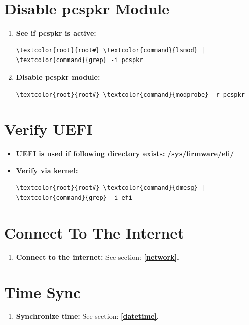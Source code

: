 \documentclass[10pt, a4paper, onecolumn, oneside, titlepage, openany]{book}
\begin{document}
\section{Disable pcspkr Module}
\begin{enumerate}
    \item \textbf{See if pcspkr is active:}  
\begin{Verbatim}[commandchars=\\\{\}]
\textcolor{root}{root#} \textcolor{command}{lsmod} | \textcolor{command}{grep} -i pcspkr
\end{Verbatim}
    \item \textbf{Disable pcspkr module:}
\begin{Verbatim}[commandchars=\\\{\}]
\textcolor{root}{root#} \textcolor{command}{modprobe} -r pcspkr
\end{Verbatim}
\end{enumerate}

\section{Verify UEFI}
\begin{itemize}
    \item \textbf{UEFI is used if following directory exists:}
\newline \textbf{\textcolor{dir}{/sys/firmware/efi/}}
    \item \textbf{Verify via kernel:}
\begin{Verbatim}[commandchars=\\\{\}]
\textcolor{root}{root#} \textcolor{command}{dmesg} | \textcolor{command}{grep} -i efi
\end{Verbatim}
\end{itemize}

\section{Connect To The Internet}
\begin{enumerate}
    \item \textbf{Connect to the internet:}
\newline See section: \underline{\textbf{\ref{network}}}.
\end{enumerate}

\section{Time Sync}
\begin{enumerate}
    \item \textbf{Synchronize time:}
\newline See section: \underline{\textbf{\ref{datetime}}}.
\end{enumerate}
\end{document}
